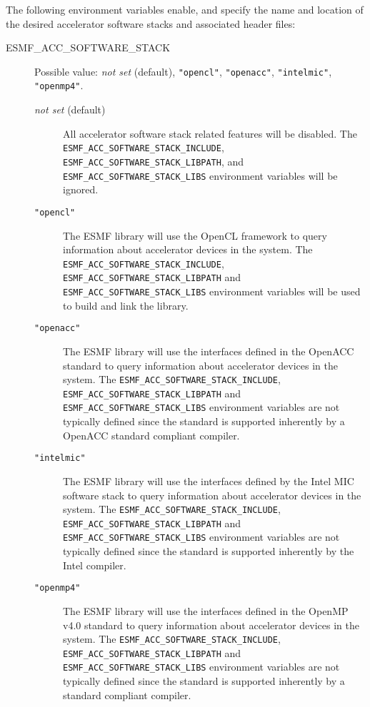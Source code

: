 The following environment variables enable, and specify the name and location
of the desired accelerator software stacks and associated header files:

\begin{description}

\item[ESMF\_ACC\_SOFTWARE\_STACK] Possible value: 
{\it not set} (default), {\tt "opencl"}, {\tt "openacc"},
{\tt "intelmic"}, {\tt "openmp4"}.

\begin{description}
\item[{\it not set} (default)] All accelerator software stack related features
 will be disabled.
The {\tt ESMF\_ACC\_SOFTWARE\_STACK\_INCLUDE}, 
{\tt ESMF\_ACC\_SOFTWARE\_STACK\_LIBPATH}, and
{\tt ESMF\_ACC\_SOFTWARE\_STACK\_LIBS} environment variables will be ignored.

\item[{\tt "opencl"}] The ESMF library will use the OpenCL
framework to query information about accelerator devices in the system.
The {\tt ESMF\_ACC\_SOFTWARE\_STACK\_INCLUDE},
{\tt ESMF\_ACC\_SOFTWARE\_STACK\_LIBPATH} and
{\tt ESMF\_ACC\_SOFTWARE\_STACK\_LIBS} environment variables will be used
to build and link the library.

\item[{\tt "openacc"}] The ESMF library will use the interfaces defined
in the OpenACC standard to query information about accelerator devices 
in the system.
The {\tt ESMF\_ACC\_SOFTWARE\_STACK\_INCLUDE},
{\tt ESMF\_ACC\_SOFTWARE\_STACK\_LIBPATH} and
{\tt ESMF\_ACC\_SOFTWARE\_STACK\_LIBS} environment variables are not typically
defined since the standard is supported inherently by a OpenACC standard
compliant compiler.

\item[{\tt "intelmic"}] The ESMF library will use the interfaces defined
by the Intel MIC software stack to query information about accelerator devices 
in the system.
The {\tt ESMF\_ACC\_SOFTWARE\_STACK\_INCLUDE},
{\tt ESMF\_ACC\_SOFTWARE\_STACK\_LIBPATH} and
{\tt ESMF\_ACC\_SOFTWARE\_STACK\_LIBS} environment variables are not typically
defined since the standard is supported inherently by the Intel compiler.

\item[{\tt "openmp4"}] The ESMF library will use the interfaces defined
in the OpenMP v4.0 standard to query information about accelerator devices 
in the system.
The {\tt ESMF\_ACC\_SOFTWARE\_STACK\_INCLUDE},
{\tt ESMF\_ACC\_SOFTWARE\_STACK\_LIBPATH} and
{\tt ESMF\_ACC\_SOFTWARE\_STACK\_LIBS} environment variables are not typically
defined since the standard is supported inherently by a standard compliant
compiler.


\end{description}
\end{description}
